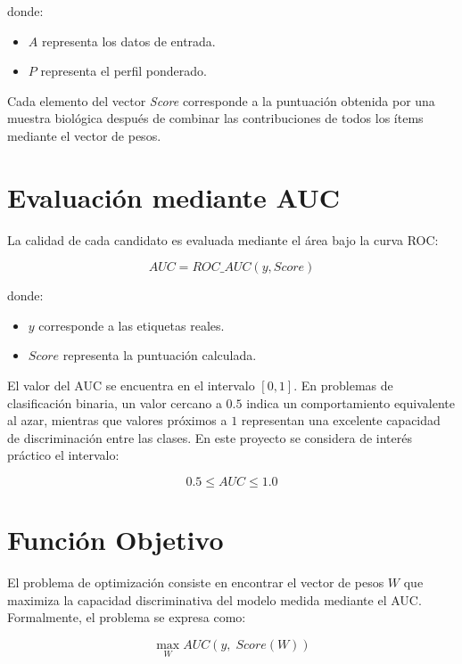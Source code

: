 donde:

\begin{itemize}
    \item $A$ representa los datos de entrada.
    \item $P$ representa el perfil ponderado.
\end{itemize}

Cada elemento del vector \textit{Score} corresponde a la puntuación obtenida por una muestra biológica después de combinar las contribuciones de todos los ítems mediante el vector de pesos.

\section{Evaluación mediante AUC}

La calidad de cada candidato es evaluada mediante el área bajo la curva ROC:

\begin{equation}
AUC = ROC\_AUC(y, Score)
\end{equation}

donde:

\begin{itemize}
    \item $y$ corresponde a las etiquetas reales.
    \item $Score$ representa la puntuación calculada.
\end{itemize}

El valor del AUC se encuentra en el intervalo $[0,1]$. En problemas de clasificación binaria, un valor cercano a $0.5$ indica un comportamiento equivalente al azar, mientras que valores próximos a $1$ representan una excelente capacidad de discriminación entre las clases. En este proyecto se considera de interés práctico el intervalo:

\begin{equation}
0.5 \le AUC \le 1.0
\end{equation}

\section{Función Objetivo}

El problema de optimización consiste en encontrar el vector de pesos $W$ que maximiza la capacidad discriminativa del modelo medida mediante el AUC. Formalmente, el problema se expresa como:

\begin{equation}
\max_{W} AUC(y,\;Score(W))
\end{equation}

